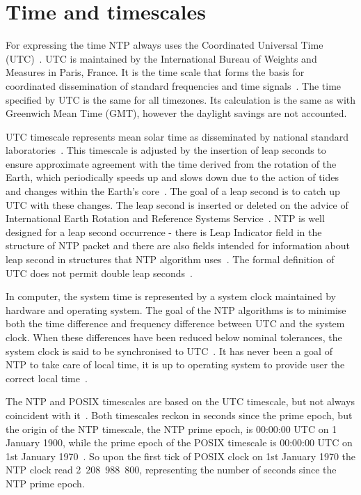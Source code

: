 
\section{Time and timescales}\label{sec:ntp-time}
For expressing the time NTP always uses the Coordinated Universal Time (UTC)~\cite{rfc5905}.
UTC is maintained by the International Bureau of Weights and Measures in Paris, France.
It is the time scale that forms the basis for coordinated dissemination
of standard frequencies and time signals~\cite{bipm-utc}.
The time specified by UTC is the same for all timezones.
Its calculation is the same as with Greenwich Mean Time (GMT),
however the daylight savings are not accounted.

UTC timescale represents mean solar time as disseminated by national
standard laboratories~\cite{rfc5905}.
This timescale is adjusted by the insertion of leap seconds to ensure approximate
agreement with the time derived from the rotation of the Earth,
which periodically speeds up and slows down due to the action
of tides and changes within the Earth's core~\cite{bipm-utc}.
The goal of a leap second is to catch up UTC with these changes.
The leap second is inserted or deleted on the advice of
International Earth Rotation and Reference Systems Service~\cite{bipm-utc}.
NTP is well designed for a leap second occurrence -
there is Leap Indicator field
in the structure of NTP packet and there are also fields intended for
information about leap second in structures that NTP algorithm uses~\cite{rfc5905}.
The formal definition of UTC does not permit double leap seconds~\cite{posix}.

In computer, the system time is represented by a system clock maintained by
hardware and operating system.
The goal of the NTP algorithms is to minimise
both the time difference and frequency difference between UTC and the system clock.
When these differences have been reduced below nominal
tolerances, the system clock is said to be synchronised to UTC~\cite{rfc5905}.
It has never been a goal of NTP to take care of local time,
it is up to operating system to provide user the correct local time~\cite{ntp-overview}.

The NTP and POSIX timescales are based on the UTC timescale,
but not always coincident with it~\cite{ntp-leap}.
Both timescales reckon in seconds since the prime epoch,
but the origin of the NTP timescale, the NTP prime epoch, is 00:00:00 UTC on 1 January 1900,
while the prime epoch of the POSIX timescale is 00:00:00 UTC on 1st January 1970~\cite{ntp-leap}.
So upon the first tick of POSIX clock on 1st January 1970 the NTP clock read 2~208~988~800,
representing the number of seconds since the NTP prime epoch.
